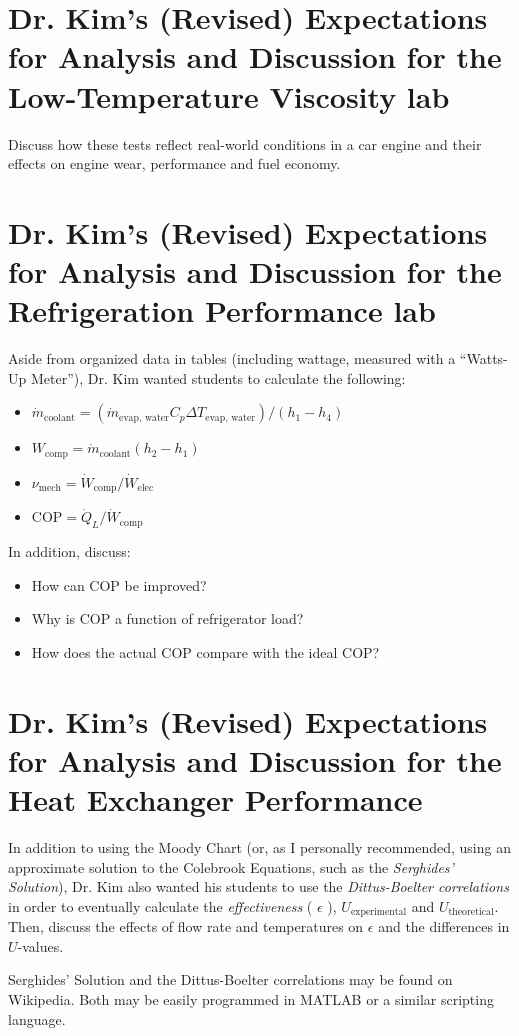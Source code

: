 \documentclass{article}
\newcommand{\kimspect}{Dr. Kim's (Revised) Expectations for Analysis and Discussion for the }
\begin{document}
\section{\kimspect Low-Temperature Viscosity lab}

Discuss how these tests reflect real-world conditions in a car engine and their
effects on engine wear, performance and fuel economy.

\pagebreak

\section{\kimspect Refrigeration Performance lab}

Aside from organized data in tables (including wattage, measured with a ``Watts-Up Meter''), Dr. Kim wanted students to calculate the
following:

\begin{itemize}
\item \(\dot{m}_{\textrm{coolant}} = (\dot{m}_{\textrm{evap, water}} C_p \Delta T_{\textrm{evap, water}})/(h_1 - h_4)\)
\item \(W_{\textrm{comp}} = \dot{m}_{\textrm{coolant}}(h_2 - h_1) \)
\item \(\nu_{\textrm{mech}} = \dot{W}_{\textrm{comp}} / \dot{W}_{\textrm{elec}} \)
\item \(\textrm{COP} = \dot{Q}_L / \dot{W}_{\textrm{comp}} \)
\end{itemize}

In addition, discuss:

\begin{itemize}
\item How can COP be improved?
\item Why is COP a function of refrigerator load?
\item How does the actual COP compare with the ideal COP?
\end{itemize}

\pagebreak

\section{\kimspect Heat Exchanger Performance}

In addition to using the Moody Chart (or, as I personally recommended, using an approximate solution to the Colebrook Equations, such as the \emph{Serghides' Solution}), Dr. Kim also wanted his students to use the \emph{Dittus-Boelter correlations} in order to eventually calculate the \emph{effectiveness} ( \(\epsilon\) ), \(U_{\textrm{experimental}}\) and \(U_{\textrm{theoretical}}\). Then, discuss the effects of flow rate and temperatures on \(\epsilon\) and the differences in \(U\)-values.

Serghides' Solution and the Dittus-Boelter correlations may be found on Wikipedia. Both may be easily programmed in MATLAB or a similar scripting language.

\pagebreak
\end{document}
